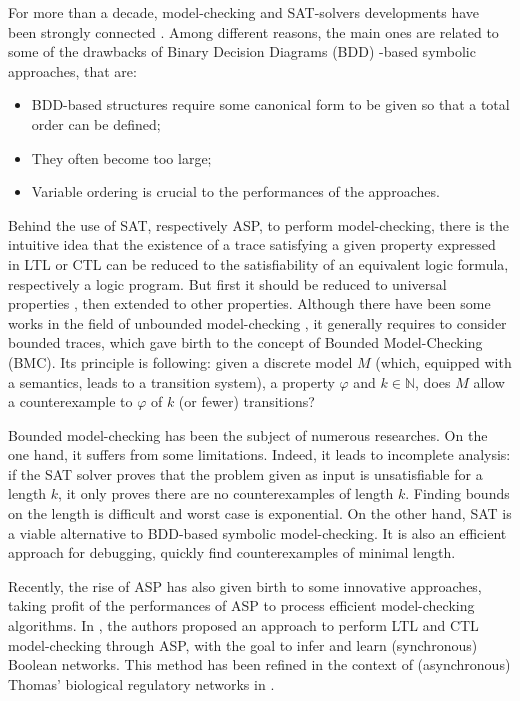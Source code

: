 For more than a decade, model-checking and SAT-solvers developments have been strongly connected \cite{biere1999symbolic}. Among different reasons, the main ones are related to some of the drawbacks of Binary Decision Diagrams (BDD) -based symbolic approaches, that are:
\begin{itemize}
\item BDD-based structures require some canonical form to be given so that a total order can be defined; 
\item They often become too large;
\item Variable ordering is crucial to the performances of the approaches.  
\end{itemize}

Behind the use of SAT, respectively ASP, to perform model-checking, there is the intuitive idea that the existence of a trace satisfying a given property expressed in LTL \cite{biere1999symbolic} or CTL can be reduced to the satisfiability of an equivalent logic formula, respectively a logic program. But first it should be reduced to universal properties \cite{penczek2002bounded}, then extended to other properties. Although there have been some works in the field of unbounded model-checking \cite{mcmillan2002applying}, it generally requires to consider bounded traces, which gave birth to the concept of Bounded Model-Checking (BMC). Its principle is following: given a discrete model $M$ (which, equipped with a semantics, leads to a transition system), a property $\varphi$ and $k \in \mathbb{N}$, does $M$ allow a counterexample to $\varphi$ of $k$ (or fewer) transitions? 

Bounded model-checking has been the subject of numerous researches. On the one hand, it suffers from some limitations. Indeed, it leads to incomplete analysis: if the SAT solver proves that the problem given as input is unsatisfiable for a length $k$, it only proves there are no counterexamples of length $k$. Finding bounds on the length is difficult and worst case is exponential. On the other hand, SAT is a viable alternative to BDD-based symbolic model-checking. It is also an efficient approach for debugging, \ie quickly find counterexamples of minimal length. 

Recently, the rise of ASP has also given birth to some innovative approaches, taking profit of the performances of ASP to process efficient model-checking algorithms. In \cite{rocca2013inference}, the authors proposed an approach to perform LTL and CTL model-checking through ASP, with the goal to infer and learn (synchronous) Boolean networks. This method has been refined in the context of (asynchronous) Thomas' biological regulatory networks in \cite{roccaasp}. 

